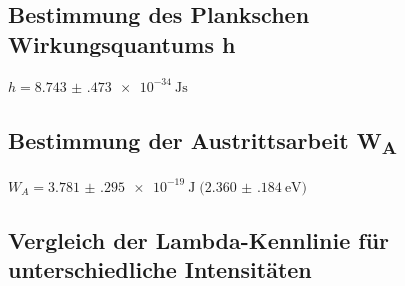 \subsection[Bestimmung des Plankschen Wirkungsquantums h]{Bestimmung des Plankschen Wirkungsquantums h}
\begin{table}[H]
\centering
{}
\caption{Gemittelte Abbrems­spannungen $\overline{U_0}$ und deren Unsicherheiten gegen die jeweiligen Frequenzen.}
\label{tab:U0_vs_nu_data}
\end{table}

\begin{table}[H]
\centering
{}
\caption{Ergebnisse des gewichteten linearen $\mathrm{\chi}^2$-Fits von $\overline{U_0}$ gegen $\nu$.}
\label{tab:U0_vs_nu_fit}
\end{table}
$h = \SI{8.743(473)e-34}{\joule\second}$


\subsection[Bestimmung der Austrittsarbeit WA]{Bestimmung der Austrittsarbeit W\textsubscript{A}}
$W_A = \SI{3.781(295)e-19}{\joule}\;\bigl(\SI{2.360(184)}{\electronvolt}\bigr)$
\subsection[Vergleich der Lambda-Kennlinie für unterschiedliche Intensitäten]{Vergleich der Lambda-Kennlinie für unterschiedliche Intensitäten}

